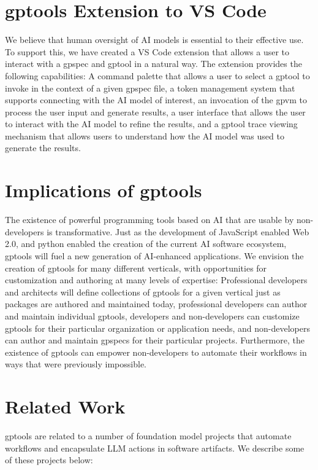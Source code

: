 \section{gptools Extension to VS Code}

We believe that human oversight of AI models is essential to their effective use. To support this, we have created a VS Code extension that allows a user to interact with a gpspec and gptool in a natural way. The extension provides the following capabilities: A command palette that allows a user to select a gptool to invoke in the context of a given gpspec file, a token management system that supports connecting with the AI model of interest, an invocation of the gpvm to process the user input and generate results, a user interface that allows the user to interact with the AI model to refine the results, and a gptool trace viewing mechanism that allows users to understand how the AI model was used to generate the results.

\section{Implications of gptools}

The existence of powerful programming tools based on AI that are usable by non-developers is transformative. Just as the development of JavaScript enabled Web 2.0, and python enabled the creation of the current AI software ecosystem, gptools will fuel a new generation of AI-enhanced applications. We envision the creation of gptools for many different verticals, with opportunities for customization and authoring at many levels of expertise: Professional developers and architects will define collections of gptools for a given vertical just as packages are authored and maintained today, professional developers can author and maintain individual gptools, developers and non-developers can customize gptools for their particular organization or application needs, and non-developers can author and maintain gpspecs for their particular projects. Furthermore, the existence of gptools can empower non-developers to automate their workflows in ways that were previously impossible.

\section{Related Work}

gptools are related to a number of foundation model projects that automate workflows and encapsulate LLM actions in software artifacts. We describe some of these projects below:

